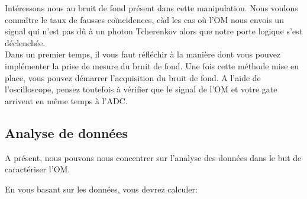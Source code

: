 Intéressons nous au bruit de fond présent dans cette manipulation. Nous voulons connaître le taux de fausses coïncidences, càd les cas où l'OM nous envois un signal qui n'est pas dû à un photon Tcherenkov alors que notre porte logique s'est déclenchée. \\

Dans un premier temps, il vous faut réfléchir à la manière dont vous pouvez implémenter la prise de mesure du bruit de fond. Une fois cette méthode mise en place, vous pouvez démarrer l'acquisition du bruit de fond. A l'aide de l'oscilloscope, pensez toutefois à vérifier que le signal de l'OM et votre gate arrivent en même temps à l'ADC.


\subsection{Analyse de donn\'ees}

A présent, nous pouvons nous concentrer sur l'analyse des donn\'ees dans le but de caractériser l'OM.

En vous basant sur les données, vous devrez calculer:
\begin{center}
\end{center}

